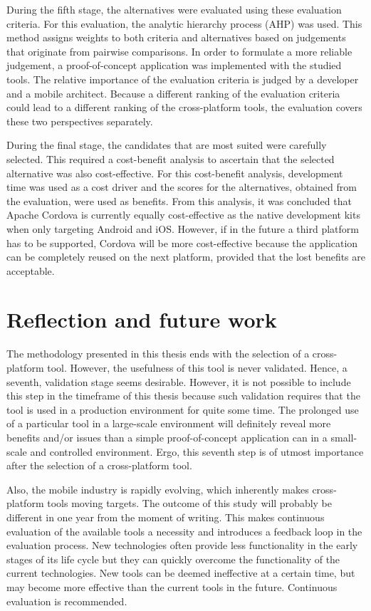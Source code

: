 During the fifth stage, the alternatives were evaluated using these evaluation criteria. For this evaluation, the analytic hierarchy process (AHP) \cite{Saaty:1980} was used. This method assigns weights to both criteria and alternatives based on judgements that originate from pairwise comparisons. In order to formulate a more reliable judgement, a proof-of-concept application was implemented with the studied tools. The relative importance of the evaluation criteria is judged by a developer and a mobile architect. Because a different ranking of the evaluation criteria could lead to a different ranking of the cross-platform tools, the evaluation covers these two perspectives separately.

During the final stage, the candidates that are most suited were carefully selected. This required a cost-benefit analysis to ascertain that the selected alternative was also cost-effective. For this cost-benefit analysis, development time was used as a cost driver and the scores for the alternatives, obtained from the evaluation, were used as benefits. From this analysis, it was concluded that Apache Cordova is currently equally cost-effective as the native development kits when only targeting Android and iOS. However, if in the future a third platform has to be supported, Cordova will be more cost-effective because the application can be completely reused on the next platform, provided that the lost benefits are acceptable.

\section{Reflection and future work}
\label{sec:reflection}

The methodology presented in this thesis ends with the selection of a cross-platform tool. However, the usefulness of this tool is never validated. Hence, a seventh, validation stage seems desirable. However, it is not possible to include this step in the timeframe of this thesis because such validation requires that the tool is used in a production environment for quite some time. The prolonged use of a particular tool in a large-scale environment will definitely reveal more benefits and/or issues than a simple proof-of-concept application can in a small-scale and controlled environment. Ergo, this seventh step is of utmost importance after the selection of a cross-platform tool.

Also, the mobile industry is rapidly evolving, which inherently makes cross-platform tools moving targets. The outcome of this study will probably be different in one year from the moment of writing. This makes continuous evaluation of the available tools a necessity and introduces a feedback loop in the evaluation process. New technologies often provide less functionality in the early stages of its life cycle but they can quickly overcome the functionality of the current technologies. New tools can be deemed ineffective at a certain time, but may become more effective than the current tools in the future. Continuous evaluation is recommended.

